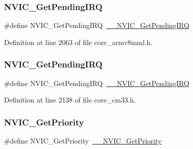 \subsubsection{\texorpdfstring{N\+V\+I\+C\+\_\+\+Get\+Pending\+I\+RQ}{NVIC\_GetPendingIRQ}\hspace{0.1cm}{\footnotesize\ttfamily [12/13]}}
{\footnotesize\ttfamily \#define N\+V\+I\+C\+\_\+\+Get\+Pending\+I\+RQ~\hyperlink{group___c_m_s_i_s___core___n_v_i_c_functions_ga5a92ca5fa801ad7adb92be7257ab9694}{\+\_\+\+\_\+\+N\+V\+I\+C\+\_\+\+Get\+Pending\+I\+RQ}}



Definition at line 2063 of file core\+\_\+armv8mml.\+h.

\mbox{\label{group___c_m_s_i_s___core___n_v_i_c_functions_gac608957a239466e9e0cbc30aa64feb3b}} 
\subsubsection{\texorpdfstring{N\+V\+I\+C\+\_\+\+Get\+Pending\+I\+RQ}{NVIC\_GetPendingIRQ}\hspace{0.1cm}{\footnotesize\ttfamily [13/13]}}
{\footnotesize\ttfamily \#define N\+V\+I\+C\+\_\+\+Get\+Pending\+I\+RQ~\hyperlink{group___c_m_s_i_s___core___n_v_i_c_functions_ga5a92ca5fa801ad7adb92be7257ab9694}{\+\_\+\+\_\+\+N\+V\+I\+C\+\_\+\+Get\+Pending\+I\+RQ}}



Definition at line 2138 of file core\+\_\+cm33.\+h.

\mbox{\label{group___c_m_s_i_s___core___n_v_i_c_functions_gaf59b9d0a791d2157abb319753953eceb}} 
\subsubsection{\texorpdfstring{N\+V\+I\+C\+\_\+\+Get\+Priority}{NVIC\_GetPriority}\hspace{0.1cm}{\footnotesize\ttfamily [1/13]}}
{\footnotesize\ttfamily \#define N\+V\+I\+C\+\_\+\+Get\+Priority~\hyperlink{group___c_m_s_i_s___core___n_v_i_c_functions_gaeb9dc99c8e7700668813144261b0bc73}{\+\_\+\+\_\+\+N\+V\+I\+C\+\_\+\+Get\+Priority}}



